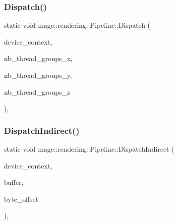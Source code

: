 \subsubsection{\texorpdfstring{Dispatch()}{Dispatch()}}
{\footnotesize\ttfamily static void mage\+::rendering\+::\+Pipeline\+::\+Dispatch (\begin{DoxyParamCaption}\item[{I\+D3\+D11\+Device\+Context \&}]{device\+\_\+context,  }\item[{\mbox{\hyperlink{namespacemage_aa5d6eaabaac3cdd01873d6a3d27e90f3}{U32}}}]{nb\+\_\+thread\+\_\+groups\+\_\+x,  }\item[{\mbox{\hyperlink{namespacemage_aa5d6eaabaac3cdd01873d6a3d27e90f3}{U32}}}]{nb\+\_\+thread\+\_\+groups\+\_\+y,  }\item[{\mbox{\hyperlink{namespacemage_aa5d6eaabaac3cdd01873d6a3d27e90f3}{U32}}}]{nb\+\_\+thread\+\_\+groups\+\_\+z }\end{DoxyParamCaption})\hspace{0.3cm}{\ttfamily [static]}, {\ttfamily [noexcept]}}

\mbox{\label{structmage_1_1rendering_1_1_pipeline_aceae5a9f2d24336e4424208a8e037a82}} 
\subsubsection{\texorpdfstring{Dispatch\+Indirect()}{DispatchIndirect()}}
{\footnotesize\ttfamily static void mage\+::rendering\+::\+Pipeline\+::\+Dispatch\+Indirect (\begin{DoxyParamCaption}\item[{I\+D3\+D11\+Device\+Context \&}]{device\+\_\+context,  }\item[{I\+D3\+D11\+Buffer \&}]{buffer,  }\item[{\mbox{\hyperlink{namespacemage_aa5d6eaabaac3cdd01873d6a3d27e90f3}{U32}}}]{byte\+\_\+offset }\end{DoxyParamCaption})\hspace{0.3cm}{\ttfamily [static]}, {\ttfamily [noexcept]}}

\mbox{\label{structmage_1_1rendering_1_1_pipeline_acc764fee84589a85e0e2df129b34b137}} 
